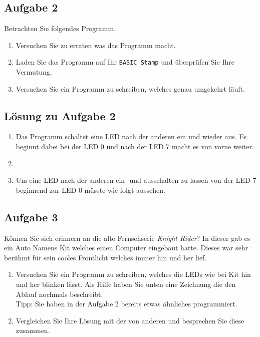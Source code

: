 \newpage
\subsection{Aufgabe 2}
Betrachten Sie folgendes Programm.



\begin{enumerate}[label=(\alph*)]
	\item Versuchen Sie zu erraten was das Programm macht.
	\item Laden Sie das Programm auf Ihr \verb!BASIC Stamp! und überprüfen Sie 
	Ihre Vermutung.
	\item Versuchen Sie ein Programm zu schreiben,
	welches genau umgekehrt läuft.
\end{enumerate}

\ifteacher
\newpage
\subsection{Lösung zu Aufgabe 2}
\begin{enumerate}[label=(\alph*)]
	\item Das Programm schaltet eine LED nach der anderen ein und wieder
	aus. Es beginnt dabei bei der LED 0 und nach der LED 7 macht es von
	vorne weiter.
	\item ~
	\item Um eine LED nach der anderen ein- und ausschalten zu lassen 
	von der LED 7 beginnend zur LED 0 müsste wie folgt aussehen.
	
\end{enumerate}
\fi

\newpage
\subsection{Aufgabe 3}
Können Sie sich erinnern an die alte Fernsehserie \emph{Knight Rider}?
In dieser gab es ein Auto Namens Kit welches einen Computer eingebaut hatte.
Dieses war sehr berühmt für sein cooles Frontlicht welches immer hin und her
lief.

\begin{enumerate}[label=(\alph*)]
	\item Versuchen Sie ein Programm zu schreiben, welches die LEDs
	wie bei Kit hin und her blinken lässt. Als Hilfe haben Sie unten 
	eine Zeichnung die den Ablauf nochmals beschreibt. \\
	\footnotesize
	Tipp: Sie haben in der Aufgabe 2 bereits etwas ähnliches programmiert.
	\normalsize
	\item Vergleichen Sie Ihre Lösung mit der von anderen und besprechen
	Sie diese zusammen.
\end{enumerate}

